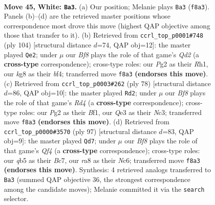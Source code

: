 \documentclass[11pt]{article}
\begin{document}
\clearpage

\begin{figure}[p]\centering
\begin{subfigure}{0.46\textwidth}\centering
\resizebox{\linewidth}{!}{%
\newchessgame
\chessboard[
  setfen={r1b2Bk1/p1p2pp1/1p3n2/1q5p/5P1b/1P2Q2P/P1B3PK/R7 w - - 2 45},
  showmover=false,
  pgfstyle=straightmove, color=movearrow, markmove={f8-a3}
]}
\caption{}
\end{subfigure}\hfill
\begin{subfigure}{0.46\textwidth}\centering
\resizebox{\linewidth}{!}{%
\newchessgame
\chessboard[
  setfen={1q3nk1/r7/4p1p1/pB1p1pP1/P2P1b1P/2B5/3Q1PK1/7R w - - 32 53},
  showmover=false,
  pgfstyle=straightmove, color=movearrow, markmove={d2-e2}
]}
\caption{}
\end{subfigure}
\\[4pt]
\begin{subfigure}{0.46\textwidth}\centering
\resizebox{\linewidth}{!}{%
\newchessgame
\chessboard[
  setfen={1r6/5p1k/1pb1p1p1/2n1q2p/2PR4/Q1N1P2P/P4PP1/5BK1 w - - 19 40},
  showmover=false,
  pgfstyle=straightmove, color=movearrow, markmove={d4-d2}
]}
\caption{}
\end{subfigure}\hfill
\begin{subfigure}{0.46\textwidth}\centering
\resizebox{\linewidth}{!}{%
\newchessgame
\chessboard[
  setfen={8/p1b3pk/2n2rpp/2pp1q2/P7/2P2N1P/1P2QPP1/2BR2K1 b - - 3 49},
  showmover=false,
  pgfstyle=straightmove, color=movearrow, markmove={f5-d7}
]}
\caption{}
\end{subfigure}
\caption{\textbf{Move 45, White: \texttt{Ba3}.} (a) Our position; Melanie plays \texttt{Ba3} (\texttt{f8a3}). Panels (b)--(d) are the retrieved master positions whose correspondence most drove this move (highest QAP objective among those that transfer to it). (b) Retrieved from \texttt{ccrl\_top\_p0001\#748} (ply 104) [structural distance $d$=74, QAP obj=12]: the master played \texttt{Qe2}; under $\mu$ our \emph{Bf8} plays the role of that game's \emph{Qd2} (a \textbf{cross-type} correspondence); cross-type roles: our \emph{P}g2 as their \emph{R}h1, our \emph{k}g8 as their \emph{b}f4; transferred move \texttt{f8a3} \textbf{(endorses this move)}. (c) Retrieved from \texttt{ccrl\_top\_p0003\#262} (ply 78) [structural distance $d$=86, QAP obj=10]: the master played \texttt{Rd2}; under $\mu$ our \emph{Bf8} plays the role of that game's \emph{Rd4} (a \textbf{cross-type} correspondence); cross-type roles: our \emph{P}g2 as their \emph{B}f1, our \emph{Q}e3 as their \emph{N}c3; transferred move \texttt{f8a3} \textbf{(endorses this move)}. (d) Retrieved from \texttt{ccrl\_top\_p0000\#3570} (ply 97) [structural distance $d$=83, QAP obj=9]: the master played \texttt{Qd7}; under $\mu$ our \emph{Bf8} plays the role of that game's \emph{Qf4} (a \textbf{cross-type} correspondence); cross-type roles: our \emph{q}b5 as their \emph{B}c7, our \emph{r}a8 as their \emph{N}c6; transferred move \texttt{f8a3} \textbf{(endorses this move)}. Synthesis: 4 retrieved analogs transferred to \texttt{Ba3} (summed QAP objective 36, the strongest correspondence among the candidate moves); Melanie committed it via the \texttt{search} selector.}
\label{fig:thought-m88}
\end{figure}
\end{document}
